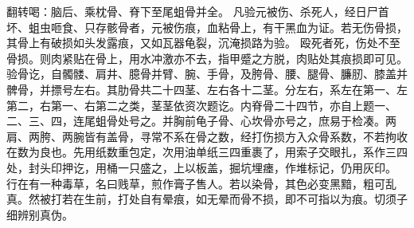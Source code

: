 \documentclass[12pt,UTF8]{ctexbook}
\begin{document}
翻转喝：脑后、乘枕骨、脊下至尾蛆骨并全。
凡验元被伤、杀死人，经日尸首坏、蛆虫咂食、只存骸骨者，元被伤痕，血粘骨上，有干黑血为证。若无伤骨损，其骨上有破损如头发露痕，又如瓦器龟裂，沉淹损路为验。
殴死者死，伤处不至骨损。则肉紧贴在骨上，用水冲激亦不去，指甲蹙之方脱，肉贴处其痕损即可见。
验骨讫，自髑髅、肩井、臆骨并臂、腕、手骨，及胯骨、腰、腿骨、臁肕、膝盖并髀骨，并摽号左右。其肋骨共二十四茎、左右各十二茎。分左右，系左在第一、左第二，右第一、右第二之类，茎茎依资次题讫。内脊骨二十四节，亦自上题一、二、三、四，连尾蛆骨处号之。并胸前龟子骨、心坎骨亦号之，庶易于检凑。两肩、两胯、两腕皆有盖骨，寻常不系在骨之数，经打伤损方入众骨系数，不若拘收在数为良也。先用纸数重包定，次用油单纸三四重裹了，用索子交眼扎，系作三四处，封头印押讫，用桶一只盛之，上以板盖，掘坑埋瘗，作堆标记，仍用灰印。
行在有一种毒草，名曰贱草，煎作膏子售人。若以染骨，其色必变黑黯，粗可乱真。然被打若在生前，打处自有晕痕，如无晕而骨不损，即不可指以为痕。切须子细辨别真伪。
\end{document}
